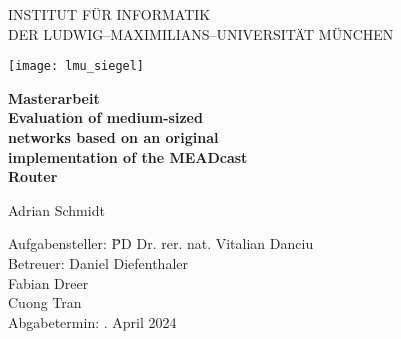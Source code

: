 
\thispagestyle{empty}

\begin{center}

\vspace*{-2cm}

{\Huge INSTITUT FÜR INFORMATIK\\[1mm]}
DER LUDWIG--MAXIMILIANS--UNIVERSITÄT MÜNCHEN\\

\vspace*{1cm}

\texttt{[image: lmu\_siegel]}

\vspace*{2cm}

{\Large \textbf{Masterarbeit}}\\ %

\vspace{2.0cm}
{\Huge \textbf{Evaluation of medium-sized}}\\
\vspace*{3mm}
{\Huge \textbf{networks based on an original}}\\
\vspace*{3mm}
{\Huge \textbf{implementation of the MEADcast}}\\
\vspace*{3mm}
{\Huge \textbf{Router}}\\
\vspace{1.5cm}

{\LARGE Adrian Schmidt} %
\vspace{2cm}

\parbox{1cm}{
\begin{large}
\begin{tabbing}
Aufgabensteller: \hspace{.5cm} \=PD Dr. rer. nat. Vitalian Danciu\\[2mm]
Betreuer:
\>Daniel Diefenthaler\\
\>Fabian Dreer\\ %
\>Cuong Tran\\[5mm]
Abgabetermin: . April 2024\\
\end{tabbing}
\end{large}}\\
\vspace{5mm}

\end{center}

